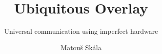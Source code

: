 \documentclass[whitelogo]{tudelft-report}
\begin{document}
\frontmatter


\title[tudelft-white]{Ubiquitous Overlay}
\subtitle[tudelft-black]{Universal communication using imperfect hardware}
\author[tudelft-white]{Matouš Skála}


%






\tableofcontents

\mainmatter



%

%

%

%

\appendix

%


\end{document}

